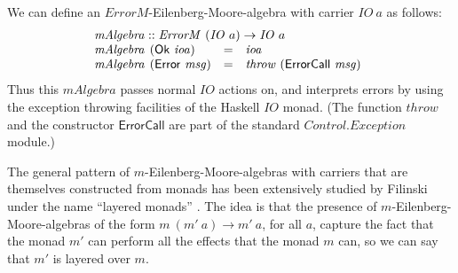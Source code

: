 \documentclass{jfp1}
\begin{document}
We can define an $\mathit{ErrorM}$-Eilenberg-Moore-algebra with
carrier $\mathit{IO}~a$ as follows:
\begin{displaymath}
  \begin{array}{l}
    \mathit{mAlgebra} :: \mathit{ErrorM}~(\mathit{IO}~a) \to \mathit{IO}~a \\
    \begin{array}{@{}l@{\hspace{0.4em}}lcl}
      \mathit{mAlgebra}&(\mathsf{Ok}~\mathit{ioa}) & = & \mathit{ioa} \\
      \mathit{mAlgebra}&(\mathsf{Error}~\mathit{msg}) & = & \mathit{throw}~(\mathsf{ErrorCall}~\mathit{msg})
    \end{array}
  \end{array}
\end{displaymath}
Thus this $\mathit{mAlgebra}$ passes normal $\mathit{IO}$ actions on,
and interprets errors by using the exception throwing facilities of
the Haskell $\mathit{IO}$ monad. (The function $\mathit{throw}$ and
the constructor $\mathsf{ErrorCall}$ are part of the standard
$\mathit{Control.Exception}$ module.)

The general pattern of $m$-Eilenberg-Moore-algebras with carriers that
are themselves constructed from monads has been extensively studied by
Filinski under the name ``layered monads''
\cite{filinski99representing}. The idea is that the presence of
$m$-Eilenberg-Moore-algebras of the form $m~(m'~a) \to m'~a$, for all
$a$, capture the fact that the monad $m'$ can perform all the effects
that the monad $m$ can, so we can say that $m'$ is layered over $m$.
\end{document}

